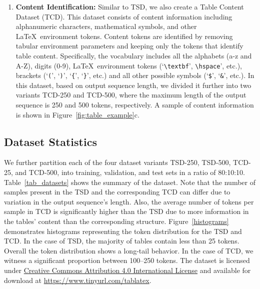 \documentclass[runningheads]{llncs}
\begin{document}
\begin{enumerate}
    \item \textbf{Content Identification:} Similar to TSD, we also create a Table Content Dataset (TCD). This dataset consists of content information including alphanumeric characters, mathematical symbols, and other \LaTeX~environment tokens. Content tokens are identified by removing tabular environment parameters and keeping only the tokens that identify table content. Specifically, the vocabulary includes all the alphabets (a-z and A-Z), digits (0-9), \LaTeX~environment tokens (`\verb+\textbf+', \verb+\hspace+', etc.), brackets (`\verb+(+', `\verb+)+', `\verb+{+', `\verb+}+', etc.) and all other possible symbols (`\verb+$+', `\verb+&+', etc.). In this dataset, based on output sequence length, we divided it further into two variants TCD-250 and TCD-500, where the maximum length of the output sequence is 250 and 500 tokens, respectively. A sample of content information is shown in Figure~\ref{fig:table_example}c.
\end{enumerate}


\subsection{Dataset Statistics}
We further partition each of the four dataset variants TSD-250, TSD-500, TCD-25, and TCD-500, into training, validation, and test sets in a ratio of 80:10:10. Table~\ref{tab_datasets} shows the summary of the dataset. Note that the number of samples present in the TSD and the corresponding TCD can differ due to variation in the output sequence's length.  Also, the average number of tokens per sample in TCD is significantly higher than the TSD due to more information in the tables' content than the corresponding structure. Figure~\ref{histograms} demonstrates histograms representing the token distribution for the TSD and TCD. In the case of TSD, the majority of tables contain less than 25 tokens. Overall the token distribution shows a long-tail behavior. In the case of TCD, we witness a significant proportion between 100--250 tokens. The dataset is licensed under \href{https://creativecommons.org/licenses/by-nc-sa/4.0/}{Creative Commons Attribution 4.0 International License} and available for download at \url{https://www.tinyurl.com/tablatex}.
\end{document}
